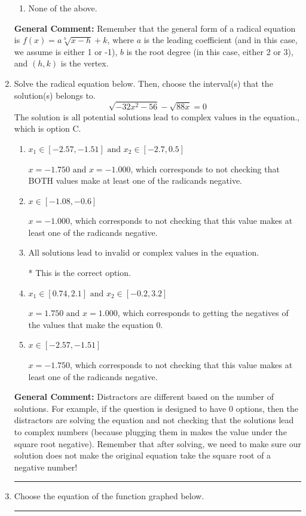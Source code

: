 \documentclass{extbook}[14pt]
\newcommand{\litem}[1]{\item #1

\rule{\textwidth}{0.4pt}}
\begin{document}
\begin{enumerate}
{\begin{enumerate}[label=\Alph*.]
\item None of the above.\end{enumerate}
\textbf{General Comment:} Remember that the general form of a radical equation is $ f(x) = a \sqrt[b]{x - h} + k $, where $a$ is the leading coefficient (and in this case, we assume is either 1 or -1), $b$ is the root degree (in this case, either 2 or 3), and $(h, k)$ is the vertex.
}
\litem{
Solve the radical equation below. Then, choose the interval(s) that the solution(s) belongs to.
\[ \sqrt{-32 x^2 - 56} - \sqrt{88 x} = 0 \]The solution is \( \text{all potential solutions lead to complex values in the equation.} \), which is option C.\begin{enumerate}[label=\Alph*.]
\item \( x_1 \in [-2.57, -1.51] \text{ and } x_2 \in [-2.7,0.5] \)

$x = -1.750 \text{ and } x = -1.000$, which corresponds to not checking that BOTH values make at least one of the radicands negative.
\item \( x \in [-1.08,-0.6] \)

$x = -1.000$, which corresponds to not checking that this value makes at least one of the radicands negative.
\item \( \text{All solutions lead to invalid or complex values in the equation.} \)

* This is the correct option.
\item \( x_1 \in [0.74, 2.1] \text{ and } x_2 \in [-0.2,3.2] \)

$x = 1.750 \text{ and } x = 1.000$, which corresponds to getting the negatives of the values that make the equation 0.
\item \( x \in [-2.57,-1.51] \)

$x = -1.750$, which corresponds to not checking that this value makes at least one of the radicands negative.
\end{enumerate}

\textbf{General Comment:} Distractors are different based on the number of solutions. For example, if the question is designed to have 0 options, then the distractors are solving the equation and not checking that the solutions lead to complex numbers (because plugging them in makes the value under the square root negative). Remember that after solving, we need to make sure our solution does not make the original equation take the square root of a negative number!
}
\litem{
Choose the equation of the function graphed below.

}
\end{enumerate}
\end{document}
